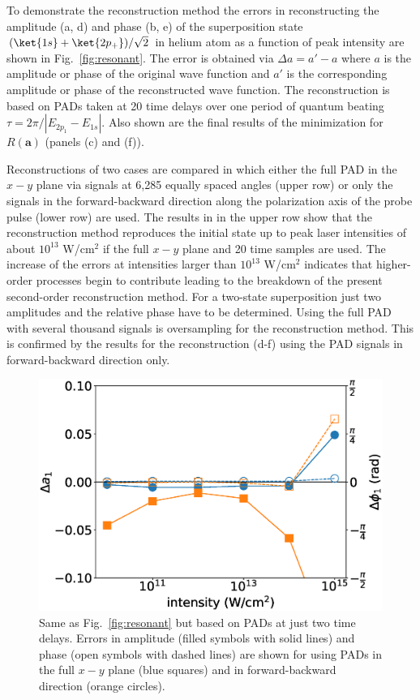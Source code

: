 To demonstrate the reconstruction method the errors in reconstructing the amplitude (a, d) and phase (b, e) of the superposition state $(\ket{1s}+\ket{2p_+})/\sqrt{2}$ in helium atom as a function of peak intensity are shown in Fig.~\ref{fig:resonant}. The error is obtained via $\Delta a = a'-a$ where $a$ is the amplitude or phase of the original wave function and $a'$ is the corresponding amplitude or phase of the reconstructed wave function. The reconstruction is based on PADs taken at 20 time delays over one period of quantum beating $\tau = 2\pi / |E_{2p_1}-E_{1s}|$. Also shown are the final results of the minimization for $R(\mathbf{a})$  (panels (c) and (f)).

 Reconstructions of two cases are compared in which either the full PAD in the $x-y$ plane via signals at 6,285 equally spaced angles  (upper row) or only the signals in the forward-backward direction along the polarization axis of the probe pulse  (lower row) are used. The results in in the upper row show that  the reconstruction method reproduces the initial state up to peak laser intensities of about $10^{13}$ W/cm$^2$ if the full $x-y$ plane and 20 time samples are used. The increase of the errors at intensities larger than $10^{13}$ W/cm$^2$ indicates that higher-order processes  begin to contribute leading to the breakdown of the present second-order reconstruction method. For a two-state superposition just two amplitudes and the relative phase have to be determined. Using the full PAD with several thousand signals is oversampling for the reconstruction method. 
This is confirmed by the results for the reconstruction (d-f) using the PAD signals in forward-backward direction only. 

\begin{figure}[!ht]
\centering
\includegraphics[width=0.5\linewidth]{figs/Photo_ionization/superpositions/Venzke_new_fig_4.eps}
\caption{
Same as Fig.\ \ref{fig:resonant} but based on PADs at just two time delays. Errors in amplitude (filled symbols with solid lines) and phase (open symbols with dashed lines) are shown for using PADs in the full $x-y$ plane (blue squares) and in forward-backward direction (orange circles).
} 
  \label{fig:twosamples}
\end{figure}

